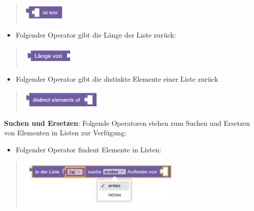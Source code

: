 \documentclass[
  letterpaper,
  DIV=11]{scrreprt}
\providecommand{\tightlist}{%
  \setlength{\itemsep}{0pt}\setlength{\parskip}{0pt}}\usepackage{longtable,booktabs,array}
\begin{document}
\begin{tcolorbox}
\begin{quote}
\includegraphics[width=0.83333in,height=\textheight]{img/screenshot-blockly-element-check-list-ist-empty-01-DEU.png}
\end{quote}

\begin{itemize}
\tightlist
\item
  Folgender Operator gibt die Länge der Liste zurück:
\end{itemize}

\begin{quote}
\includegraphics[width=1.04167in,height=\textheight]{img/screenshot-blockly-element-check-list-get-length-01-DEU.png}
\end{quote}

\begin{itemize}
\tightlist
\item
  Folgender Operator gibt die distinkte Elemente einer Liste zurück
\end{itemize}

\begin{quote}
\includegraphics[width=1.5625in,height=\textheight]{img/screenshot-blockly-element-list-get-distinct-elements-01-DEU.png}
\end{quote}

\textbf{Suchen und Ersetzen}: Folgende Operatoren stehen zum Suchen und
Ersetzen von Elementen in Listen zur Verfügung:

\begin{itemize}
\tightlist
\item
  Folgender Operator findent Elemente in Listen:
\end{itemize}

\begin{quote}
\includegraphics[width=3.125in,height=\textheight]{img/screenshot-blockly-element-find-in-list-01-DEU.png}
\end{quote}


\end{tcolorbox}
\end{document}
